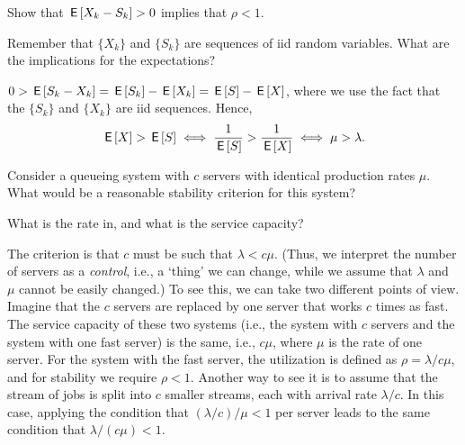 \begin{exercise}\label{ex:l-253}
 Show
that $\,\mathsf{E}\left[ X_k-S_k\right] > 0$ implies that $\rho < 1$.
\begin{hint}
Remember that $\{X_k\}$ and $\{S_k\}$ are sequences of iid random variables. What are the implications for the expectations?
\end{hint}
\begin{solution}
 $0>  \,\mathsf{E}\left[S_{k}-X_k\right] = \,\mathsf{E}\left[ S_{k}\right]- \,\mathsf{E}\left[X_k\right] = \,\mathsf{E}\left[S\right] - \,\mathsf{E}\left[X\right]$, where we use the fact that the $\{S_k\}$ and $\{X_k\}$ are iid sequences. Hence,
 \begin{equation*}
 \,\mathsf{E}\left[X\right] > \,\mathsf{E}\left[S\right] \iff \frac 1{\,\mathsf{E}\left[S\right]} > \frac1{\,\mathsf{E}\left[X\right]} \iff \mu > \lambda.
 \end{equation*}

\end{solution}
\end{exercise}


\begin{exercise}\label{ex:l-164}
 Consider a queueing system with $c$ servers with identical production rates $\mu$.
 What would be a reasonable stability criterion for this system?
\begin{hint}
What is the rate in, and what is the service capacity?
\end{hint}
\begin{solution}
 The criterion is that $c$ must be such that $\lambda < c\mu$.
 (Thus, we interpret the number of servers as a \emph{control}, i.e., a `thing' we can change, while we assume that $\lambda$ and $\mu$ cannot be easily changed.)
 To see this, we can take two different points of view.
 Imagine that the $c$ servers are replaced by one server that works $c$ times as fast.
 The service capacity of these two systems (i.e., the system with $c$ servers and the system with one fast server) is the same, i.e., $c\mu$, where $\mu$ is the rate of one server.
 For the system with the fast server, the utilization is defined as $\rho =\lambda/c\mu$, and for stability we require $\rho<1$.
 Another way to see it is to assume that the stream of jobs is split into $c$ smaller streams, each with arrival rate $\lambda/c$.
 In this case, applying the condition that $(\lambda/c )/\mu<1$ per server leads to the same condition that $\lambda/(c\mu) < 1$.
\end{solution}
\end{exercise}






